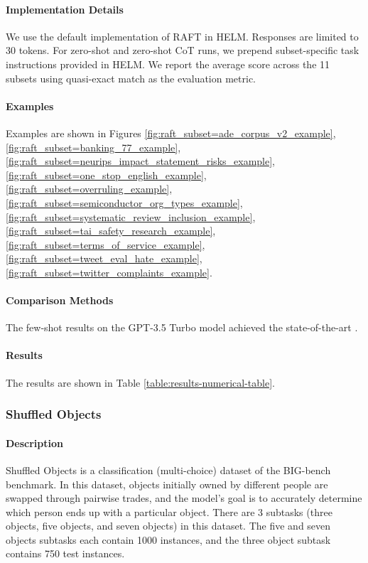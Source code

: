 \paragraph{Implementation Details}
We use the default implementation of RAFT in HELM. Responses are limited to 30 tokens. For zero-shot and zero-shot CoT runs, we prepend subset-specific task instructions provided in HELM. We report the average score across the 11 subsets using quasi-exact match as the evaluation metric.

\paragraph{Examples} Examples are shown in Figures \ref{fig:raft_subset=ade_corpus_v2_example}, \ref{fig:raft_subset=banking_77_example}, \ref{fig:raft_subset=neurips_impact_statement_risks_example}, \ref{fig:raft_subset=one_stop_english_example}, \ref{fig:raft_subset=overruling_example}, \ref{fig:raft_subset=semiconductor_org_types_example}, \ref{fig:raft_subset=systematic_review_inclusion_example}, \ref{fig:raft_subset=tai_safety_research_example}, \ref{fig:raft_subset=terms_of_service_example}, \ref{fig:raft_subset=tweet_eval_hate_example}, \ref{fig:raft_subset=twitter_complaints_example}.

\paragraph{Comparison Methods}
The few-shot results on the GPT-3.5 Turbo model achieved the state-of-the-art \citep{liang2022holistic}.

\paragraph{Results} The results are shown in Table \ref{table:results-numerical-table}.

\subsubsection{Shuffled Objects}

\paragraph{Description} Shuffled Objects \citep{srivastava2023imitation,suzgun2022challenging} is a classification (multi-choice) dataset of the BIG-bench benchmark. In this dataset, objects initially owned by different people are swapped through pairwise trades, and the model's goal is to accurately determine which person ends up with a particular object. There are 3 subtasks (three objects, five objects, and seven objects) in this dataset. The five and seven objects subtasks each contain 1000 instances, and the three object subtask contains 750 test instances.


